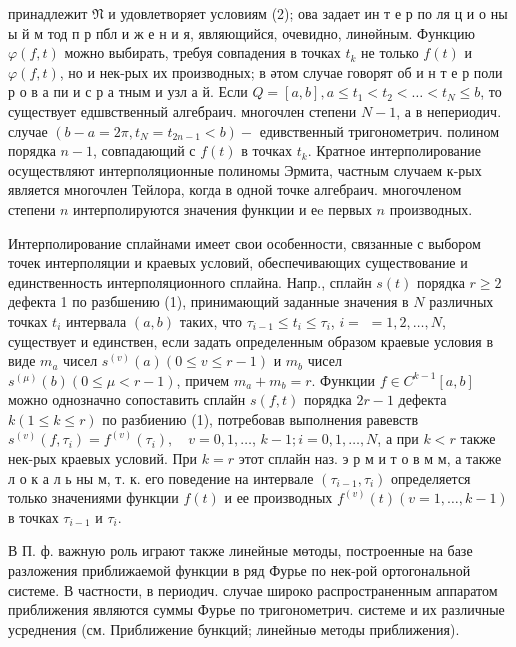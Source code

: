 \documentclass[10pt]{article}
\begin{document}
принадлежит $\mathfrak{N}$ и удовлетворяет условиям (2); ова задает ин т е р по ля ц и о ны ы й м тод п р пбл и ж е н и я, являющийся, очевидно, линөйным. Функцию $\varphi(f, t)$ можно выбирать, требуя совпадения в точках $t_{k}$ не только $f(t)$ и $\varphi(f, t)$, но и нек-рых их производных; в әтом случае говорят об и н т е р поли р о в а пи и с р а тным и узл а й. Если $Q=[a, b], a \leqslant t_{1}<t_{2}<\ldots<t_{N} \leqslant b$, то существует едшвственный алгебраич. многочлен степени $N-1$, а в непериодич. случае $\left(b-a=2 \pi, t_{N}=t_{2 n-1}<b\right)-$ едивственный тригонометрич. полином порядка $n-1$, совпадающий с $f(t)$ в точках $t_{k}$. Кратное интерполирование осуществляют интерполяционные полиномы Эрмита, частным случаем к-рых является многочлен Тейлора, когда в одной точке алгебраич. многочленом степени $n$ интерполируются значения функции и еe первых $n$ производных.



Интерполирование сплайнами имеет свои особенности, связанные с выбором точек интерполяции и краевых условий, обеспечивающих существование и единственность интерполяционного сплайна. Напр., сплайн $s(t)$ порядка $r \geqslant 2$ дефекта 1 по разбшению (1), принимающий заданные значения в $N$ различных точках $t_{i}$ интервала $(a, b)$ таких, что $\tau_{i-1} \leqslant t_{i} \leqslant \tau_{i}$, $i=$ $=1,2, \ldots, N$, существует и единствен, если задать определенным образом краевые условия в виде $m_{a}$ чисел $s^{(v)}(a)(0 \leqslant v \leqslant r-1)$ и $m_{b}$ чисел $s^{(\mu)}(b)(0 \leqslant \mu<r-1)$, причем $m_{a}+m_{b}=r$. Функции $f \in C^{k-1}[a, b]$ можно однозначно сопоставить сплайн $s(f, t)$ порядка $2 r-1$ дефекта $k(1 \leqslant k \leqslant r)$ по разбиению (1), потребовав выполнения равевств $s^{(v)}\left(f, \tau_{i}\right)=f^{(v)}\left(\tau_{i}\right), \quad v=0,1, \ldots$, $k-1 ; i=0,1, \ldots, N$, а при $k<r$ также нек-рых краевых условий. При $k=r$ этот сплайн наз. э р м и т о в м м, а также л о к а л ь ны м, т. к. его поведение на интервале $\left(\tau_{i-1}, \tau_{i}\right)$ определяется только значениями функции $f(t)$ и ее производных $f^{(v)}(t)(v=1, \ldots, k-1)$ в точках $\tau_{i-1}$ и $\tau_{i}$.



В П. ф. важную роль играют также линейные мөтоды, построенные на базе разложения приближаемой функции в ряд Фурье по нек-рой ортогональной системе. В частности, в периодич. случае широко распространенным аппаратом приближения являются суммы Фурье по тригонометрич. системе и их различные усреднения (см. Приближение бункций; линейныө методы приближения).
\end{document}
